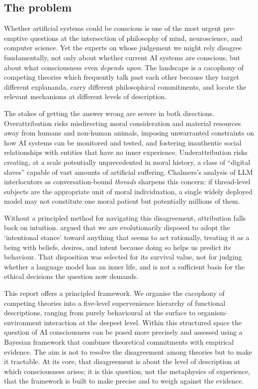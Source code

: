 \documentclass[11pt, a4paper, onecolumn, gdm]{google}
\begin{document}
\subsection{The problem}\label{the-problem}

Whether artificial systems could be conscious is one of the most urgent pre-emptive questions at the intersection of philosophy of mind, neuroscience, and computer science.
Yet the experts on whose judgement we might rely disagree fundamentally, not only about whether current AI systems are conscious, but about what consciousness even \emph{depends upon}.
The landscape is a cacophony of competing theories which frequently talk past each other because they target different explananda, carry different philosophical commitments, and locate the relevant mechanisms at different levels of description.

The stakes of getting the answer wrong are severe in both directions.
Overattribution risks misdirecting moral consideration and material resources away from humans and non-human animals, imposing unwarranted constraints on how AI systems can be monitored and tested, and fostering inauthentic social relationships with entities that have no inner experience.
Underattribution risks creating, at a scale potentially unprecedented in moral history, a class of ``digital slaves'' capable of vast amounts of artificial suffering.
Chalmers's \citeyearpar{chalmers2026} analysis of LLM interlocutors as conversation-bound \emph{threads} sharpens this concern: if thread-level subjects are the appropriate unit of moral individuation, a single widely deployed model may not constitute one moral patient but potentially millions of them.

Without a principled method for navigating this disagreement, attribution falls back on intuition.
\citet{dennett1987} argued that we are evolutionarily disposed to adopt the `intentional stance' toward anything that seems to act rationally, treating it as a being with beliefs, desires, and intent because doing so helps us predict its behaviour.
That disposition was selected for its survival value, not for judging whether a language model has an inner life, and is not a sufficient basis for the ethical decisions the question now demands.

This report offers a principled framework.
We organise the cacophony of competing theories into a five-level supervenience hierarchy of functional descriptions, ranging from purely behavioural at the surface to organism-environment interaction at the deepest level.
Within this structured space the question of AI consciousness can be posed more precisely and assessed using a Bayesian framework that combines theoretical commitments with empirical evidence.
The aim is not to resolve the disagreement among theories but to make it tractable.
At its core, that disagreement is about the level of description at which consciousness arises; it is this question, not the metaphysics of experience, that the framework is built to make precise and to weigh against the evidence.
\end{document}
